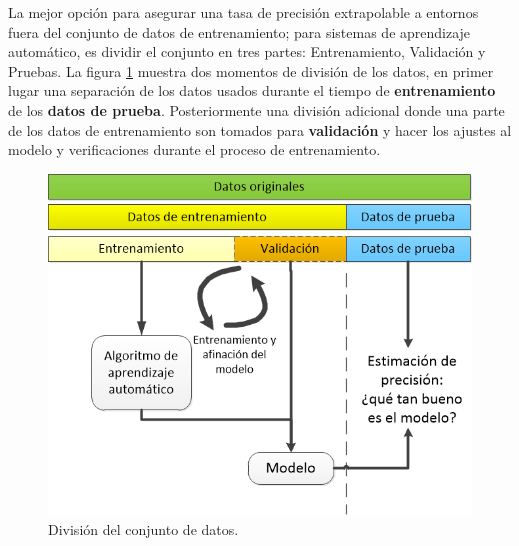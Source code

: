        La mejor opción para asegurar una tasa de precisión extrapolable a entornos fuera del conjunto de datos de entrenamiento; para sistemas de aprendizaje automático, es dividir el conjunto en tres partes: Entrenamiento, Validación y Pruebas. La figura \ref{fig:DatasetSplitting} muestra dos momentos de división de los datos, en primer lugar una separación de los datos usados durante el tiempo de \textbf{entrenamiento} de los \textbf{datos de prueba}. Posteriormente una división adicional donde una parte de los datos de entrenamiento son tomados para \textbf{validación} y hacer los ajustes al modelo y verificaciones durante el proceso de entrenamiento. 
        
        \begin{figure}[ht!]
        	\centering
        	\includegraphics[width=0.8\linewidth]{imgs/02-Referential/02-dataset-splitting.png}
        	\caption[División del conjunto de datos.]{División del conjunto de datos.}
    	    \label{fig:DatasetSplitting}
        \end{figure}%
        
